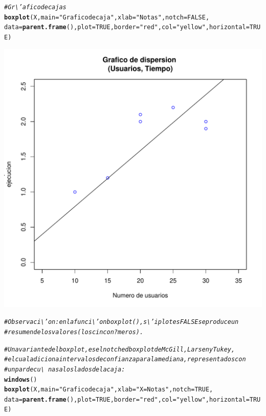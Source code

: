 \documentclass[12pt,letterpaper]{article}\usepackage[]{graphicx}\usepackage[]{color}
\makeatletter
\def\maxwidth{ %
  \ifdim\Gin@nat@width>\linewidth
    \linewidth
  \else
    \Gin@nat@width
  \fi
}
\newcommand{\hlnum}[1]{\textcolor[rgb]{0.686,0.059,0.569}{#1}}%
\newcommand{\hlstr}[1]{\textcolor[rgb]{0.192,0.494,0.8}{#1}}%
\newcommand{\hlcom}[1]{\textcolor[rgb]{0.678,0.584,0.686}{\textit{#1}}}%
\newcommand{\hlstd}[1]{\textcolor[rgb]{0.345,0.345,0.345}{#1}}%
\newcommand{\hlkwc}[1]{\textcolor[rgb]{0.333,0.667,0.333}{#1}}%
\newcommand{\hlkwd}[1]{\textcolor[rgb]{0.737,0.353,0.396}{\textbf{#1}}}%
\newenvironment{kframe}{%
 \def\at@end@of@kframe{}%
 \ifinner\ifhmode%
  \def\at@end@of@kframe{\end{minipage}}%
  \begin{minipage}{\columnwidth}%
 \fi\fi%
 \def\FrameCommand##1{\hskip\@totalleftmargin \hskip-\fboxsep
 \colorbox{shadecolor}{##1}\hskip-\fboxsep
     \hskip-\linewidth \hskip-\@totalleftmargin \hskip\columnwidth}%
 \MakeFramed {\advance\hsize-\width
   \@totalleftmargin\z@ \linewidth\hsize
   \@setminipage}}%
 {\par\unskip\endMakeFramed%
 \at@end@of@kframe}
\newenvironment{knitrout}{}{} %
\makeatother
\begin{document}
\begin{knitrout}
\color{fgcolor}\begin{kframe}
\begin{alltt}
\hlcom{# Gr\textbackslash{}'afico de cajas}
\hlkwd{boxplot}\hlstd{(X,} \hlkwc{main}\hlstd{=}\hlstr{"Grafico de caja"}\hlstd{,} \hlkwc{xlab}\hlstd{=}\hlstr{"Notas"}\hlstd{,} \hlkwc{notch}\hlstd{=}\hlnum{FALSE}\hlstd{,}
\hlkwc{data}\hlstd{=}\hlkwd{parent.frame}\hlstd{(),} \hlkwc{plot}\hlstd{=}\hlnum{TRUE}\hlstd{,} \hlkwc{border}\hlstd{=}\hlstr{"red"}\hlstd{,} \hlkwc{col}\hlstd{=}\hlstr{"yellow"}\hlstd{,}\hlkwc{horizontal}\hlstd{=}\hlnum{TRUE}\hlstd{)}
\end{alltt}
\end{kframe}
\includegraphics[width=\maxwidth]{figure/unnamed-chunk-12-1} 
\begin{kframe}\begin{alltt}
\hlcom{# Observaci\textbackslash{}'on: en la funci\textbackslash{}'on boxplot(), s\textbackslash{}'i plot es FALSE se produce un }
\hlcom{# resumen de los valores (los cinco n?meros).}

\hlcom{# Una variante del boxplot, es el notched boxplot de McGill, Larsen y Tukey, }
\hlcom{# el cual adiciona intervalos de confianza para la mediana, representados con }
\hlcom{# un par de cu\textbackslash{}~nas a los lados de la caja:}
\hlkwd{windows}\hlstd{()}
\hlkwd{boxplot}\hlstd{(X,} \hlkwc{main}\hlstd{=}\hlstr{"Grafico de caja"}\hlstd{,} \hlkwc{xlab}\hlstd{=}\hlstr{"X = Notas"}\hlstd{,} \hlkwc{notch}\hlstd{=}\hlnum{TRUE}\hlstd{,}
\hlkwc{data}\hlstd{=}\hlkwd{parent.frame}\hlstd{(),} \hlkwc{plot}\hlstd{=}\hlnum{TRUE}\hlstd{,} \hlkwc{border}\hlstd{=}\hlstr{"red"}\hlstd{,} \hlkwc{col}\hlstd{=}\hlstr{"yellow"}\hlstd{,}\hlkwc{horizontal}\hlstd{=}\hlnum{TRUE}\hlstd{)}


\end{alltt}
\end{kframe}
\end{knitrout}
\end{document}
